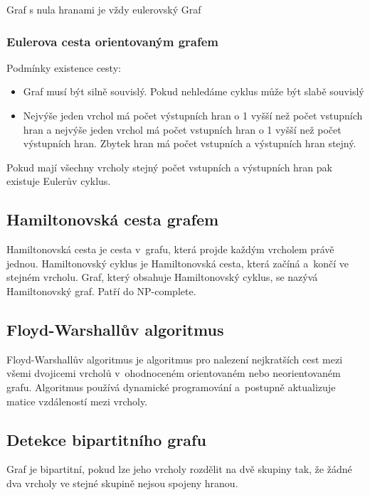 Graf s nula hranami je vždy eulerovský Graf
\subsubsection{Eulerova cesta orientovaným grafem}
Podmínky existence cesty:
\begin{itemize}
    \item Graf musí být silně souvislý. Pokud nehledáme cyklus může být slabě souvislý
    \item Nejvýše jeden vrchol má počet výstupních hran o 1 vyšší než počet vstupních hran a nejvýše jeden vrchol má počet vstupních hran o 1 vyšší než počet výstupních hran. Zbytek hran má počet vstupních a výstupních hran stejný.
\end{itemize}

Pokud mají všechny vrcholy stejný počet vstupních a výstupních hran pak existuje Eulerův cyklus.
\subsection{Hamiltonovská cesta grafem}

Hamiltonovská cesta je cesta v~grafu, která projde každým vrcholem právě jednou. Hamiltonovský cyklus je Hamiltonovská cesta, která začíná a~končí ve stejném vrcholu. Graf, který obsahuje Hamiltonovský cyklus, se nazývá Hamiltonovský graf. Patří do NP-complete.

\subsection{Floyd-Warshallův algoritmus}

Floyd-Warshallův algoritmus je algoritmus pro nalezení nejkratších cest mezi všemi dvojicemi vrcholů v~ohodnoceném orientovaném nebo neorientovaném grafu. Algoritmus používá dynamické programování a~postupně aktualizuje matice vzdáleností mezi vrcholy.


\subsection{Detekce bipartitního grafu}

Graf je bipartitní\footnotemark[1], pokud lze jeho vrcholy rozdělit na dvě skupiny tak, že žádné dva vrcholy ve stejné skupině nejsou spojeny hranou.


